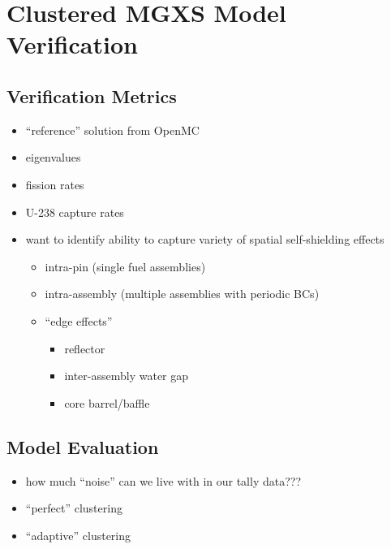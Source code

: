 \chapter{Clustered MGXS Model Verification}
\label{chap:verify}


\section{Verification Metrics}
\label{sec:chap7-verify}

\begin{itemize}[noitemsep]
  \item ``reference'' solution from OpenMC
  \item eigenvalues
  \item fission rates
  \item U-238 capture rates
  \item want to identify ability to capture variety of spatial self-shielding effects
  \begin{itemize}[noitemsep]
    \item intra-pin (single fuel assemblies)
    \item intra-assembly (multiple assemblies with periodic BCs)
    \item ``edge effects''
    \begin{itemize}[noitemsep]
      \item reflector
      \item inter-assembly water gap
      \item core barrel/baffle
    \end{itemize}
  \end{itemize}
\end{itemize}


\section{Model Evaluation}
\label{sec:chap7-evaluate}

\begin{itemize}[noitemsep]
  \item how much ``noise'' can we live with in our tally data???
  \item ``perfect'' clustering
  \item ``adaptive'' clustering
\end{itemize}


